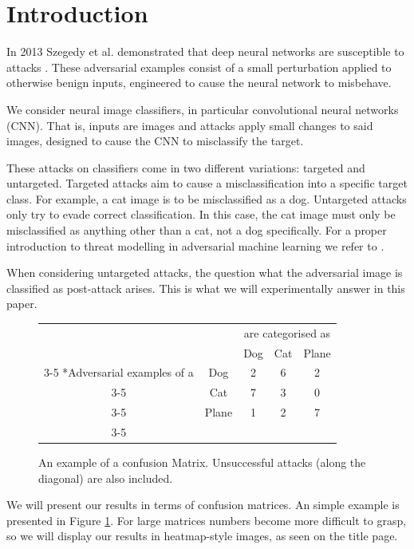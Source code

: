 \documentclass{article}
\begin{document}
\section{Introduction}
In 2013 Szegedy et al. demonstrated that deep neural networks are susceptible to attacks \cite{Szegedy13}. These adversarial examples consist of a small perturbation applied to otherwise benign inputs, engineered to cause the neural network to misbehave.

We consider neural image classifiers, in particular convolutional neural networks \cite{lecun1999object} (CNN).
That is, inputs are images and attacks apply small changes to said images, designed to cause the CNN to misclassify the target.

These attacks on classifiers come in two different variations: targeted and untargeted.
Targeted attacks aim to cause a misclassification into a specific target class. For example, a cat image is to be misclassified as a dog.
Untargeted attacks only try to evade correct classification. In this case, the cat image must only be misclassified as anything other than a cat, not a dog specifically.
For a proper introduction to threat modelling in adversarial machine learning we refer to \cite{biggio2018wild}.

When considering untargeted attacks, the question what the adversarial image is classified as post-attack arises. This is what we will experimentally answer in this paper.

\begin{figure}[h]
	\begin{tabular}{cc|c|c|c|}
		& \multicolumn{1}{c}{} & \multicolumn{3}{c}{are categorised as}\\
		& \multicolumn{1}{c}{} & \multicolumn{1}{c}{Dog}  & \multicolumn{1}{c}{Cat} & \multicolumn{1}{c}{Plane} \\\cline{3-5}
		\multirow{3}*{Adversarial examples of a}  & Dog & 2 & 6 & 2\\\cline{3-5}
		& Cat & 7 & 3 &  0 \\\cline{3-5}
		& Plane & 1 & 2 &  7 \\\cline{3-5}
	\end{tabular}

	\caption{An example of a confusion Matrix. Unsuccessful attacks (along the diagonal) are also included.}
	\label{fig:matrixexample}
\end{figure}
We will present our results in terms of confusion matrices. An simple example is presented in Figure \ref{fig:matrixexample}. For large matrices numbers become more difficult to grasp, so we will display our results in heatmap-style images, as seen on the title page.
\end{document}
